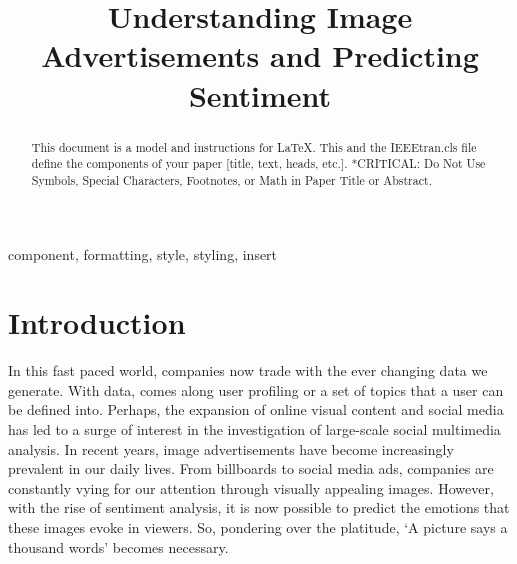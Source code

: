 \documentclass[conference]{IEEEtran}
\begin{document}
\title{Understanding Image Advertisements and Predicting Sentiment\\}

\author{
\and
{}
}

\maketitle

\begin{abstract}
This document is a model and instructions for \LaTeX.
This and the IEEEtran.cls file define the components of your paper [title, text, heads, etc.]. *CRITICAL: Do Not Use Symbols, Special Characters, Footnotes, 
or Math in Paper Title or Abstract.
\end{abstract}

\begin{IEEEkeywords}
component, formatting, style, styling, insert
\end{IEEEkeywords}

\section{Introduction}
In this fast paced world, companies now trade with the ever changing data we generate. With data, comes along user profiling or a set of topics that a user can be defined into. Perhaps, the  expansion of online visual content and social media has led to a surge of interest in the investigation of large-scale social multimedia analysis. In recent years, image advertisements have become increasingly prevalent in our daily lives. From billboards to social media ads, companies are constantly vying for our attention through visually appealing images. However, with the rise of sentiment analysis, it is now possible to predict the emotions that these images evoke in viewers. So, pondering over the platitude, `A picture says a thousand words' becomes necessary.
\end{document}

